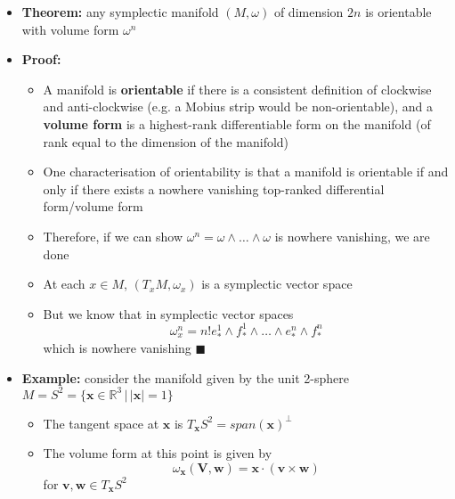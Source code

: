 \documentclass[12pt,a4paper]{article}
\numberwithin{equation}{section}
\begin{document}
\begin{itemize}
		\item \textbf{Theorem:} any symplectic manifold $(M,\omega)$ of dimension $2n$ is orientable with volume form $\omega^{n}$
		\item \textbf{Proof:}
		\begin{itemize}
			\item A manifold is \textbf{orientable} if there is a consistent definition of clockwise and anti-clockwise (e.g. a Mobius strip would be non-orientable), and a \textbf{volume form} is a highest-rank differentiable form on the manifold (of rank equal to the dimension of the manifold)
			\item One characterisation of orientability is that a manifold is orientable if and only if there exists a nowhere vanishing top-ranked differential form/volume form
			\item Therefore, if we can show $\omega^{n}=\omega\wedge\ldots\wedge\omega$ is nowhere vanishing, we are done
			\item At each $x\in M$, $(T_{x}M,\omega_{x})$ is a symplectic vector space
			\item But we know that in symplectic vector spaces
			\begin{equation}
				\omega_{x}^{n}=n!e_{*}^{1}\wedge f_{*}^{1}\wedge\ldots\wedge e_{*}^{n}\wedge f_{*}^{n}
			\end{equation}
			which is nowhere vanishing $\blacksquare$
		\end{itemize}
		\item \textbf{Example:} consider the manifold given by the unit 2-sphere $M=S^{2}=\{\mathbf{x}\in\mathbb{R}^{3}\,|\,\lvert\mathbf{x}\rvert=1\}$
		\begin{itemize}
			\item The tangent space at $\mathbf{x}$ is $T_{\mathbf{x}}S^{2}=span(\mathbf{x})^{\perp}$
			\item The volume form at this point is given by
			\begin{equation}
				\omega_{\mathbf{x}}(\mathbf{V},\mathbf{w})=\mathbf{x}\cdot (\mathbf{v}\times\mathbf{w})
			\end{equation}
			for $\mathbf{v},\mathbf{w}\in T_{\mathbf{x}}S^{2}$
		\end{itemize}
	\end{itemize}
\end{document}
